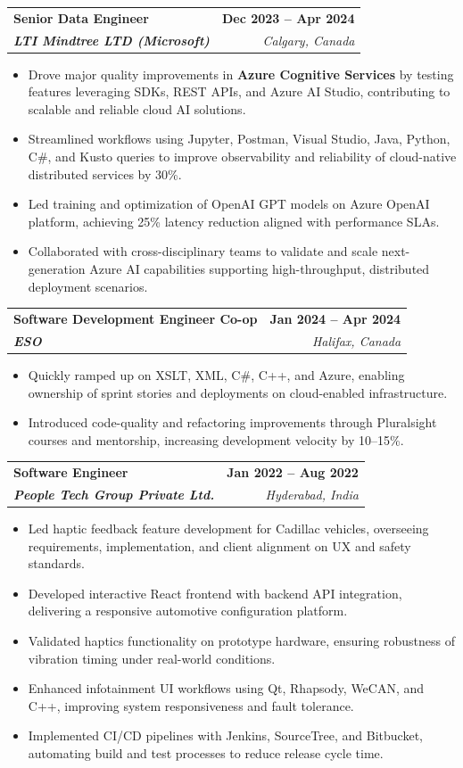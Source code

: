 \documentclass[letterpaper,11pt]{article}
\makeatletter
\newcommand{\resumeItem}[1]{
  \item\small{
    {#1 \vspace{-2pt}}
  }
}
\newcommand{\resumeSubheading}[4]{
  \vspace{-2pt}\item
    \begin{tabular*}{1.0\textwidth}[t]{l@{\extracolsep{\fill}}r}
      \textbf{#1} & \textbf{\small #2} \\
      \textit{\small#3} & \textit{\small #4} \\
    \end{tabular*}\vspace{-7pt}
}
\newcommand{\resumeItemListStart}{\begin{itemize}}
\newcommand{\resumeItemListEnd}{\end{itemize}\vspace{-5pt}}
\makeatother
\begin{document}
    \resumeSubheading
      {\textbf{Senior Data Engineer}}{\textbf{Dec 2023 -- Apr 2024}}
      {\textbf{LTI Mindtree LTD (Microsoft)}}{Calgary, Canada}
      \resumeItemListStart
        \resumeItem{Drove major quality improvements in \textbf{Azure Cognitive Services} by testing features leveraging SDKs, REST APIs, and Azure AI Studio, contributing to scalable and reliable cloud AI solutions.}
        \resumeItem{Streamlined workflows using Jupyter, Postman, Visual Studio, Java, Python, C\#, and Kusto queries to improve observability and reliability of cloud-native distributed services by 30\%.}
        \resumeItem{Led training and optimization of OpenAI GPT models on Azure OpenAI platform, achieving 25\% latency reduction aligned with performance SLAs.}
        \resumeItem{Collaborated with cross-disciplinary teams to validate and scale next-generation Azure AI capabilities supporting high-throughput, distributed deployment scenarios.}
      \resumeItemListEnd
    
    \resumeSubheading
      {\textbf{Software Development Engineer Co-op}}{\textbf{Jan 2024 -- Apr 2024}}
      {\textbf{ESO}}{Halifax, Canada}
      \resumeItemListStart
        \resumeItem{Quickly ramped up on XSLT, XML, C\#, C++, and Azure, enabling ownership of sprint stories and deployments on cloud-enabled infrastructure.}
        \resumeItem{Introduced code-quality and refactoring improvements through Pluralsight courses and mentorship, increasing development velocity by 10--15\%.}
      \resumeItemListEnd

    \resumeSubheading
      {\textbf{Software Engineer}}{\textbf{Jan 2022 -- Aug 2022}}
      {\textbf{People Tech Group Private Ltd.}}{Hyderabad, India}
      \resumeItemListStart
        \resumeItem{Led haptic feedback feature development for Cadillac vehicles, overseeing requirements, implementation, and client alignment on UX and safety standards.}
        \resumeItem{Developed interactive React frontend with backend API integration, delivering a responsive automotive configuration platform.}
        \resumeItem{Validated haptics functionality on prototype hardware, ensuring robustness of vibration timing under real-world conditions.}
        \resumeItem{Enhanced infotainment UI workflows using Qt, Rhapsody, WeCAN, and C++, improving system responsiveness and fault tolerance.}
        \resumeItem{Implemented CI/CD pipelines with Jenkins, SourceTree, and Bitbucket, automating build and test processes to reduce release cycle time.}
      \resumeItemListEnd
\end{document}
